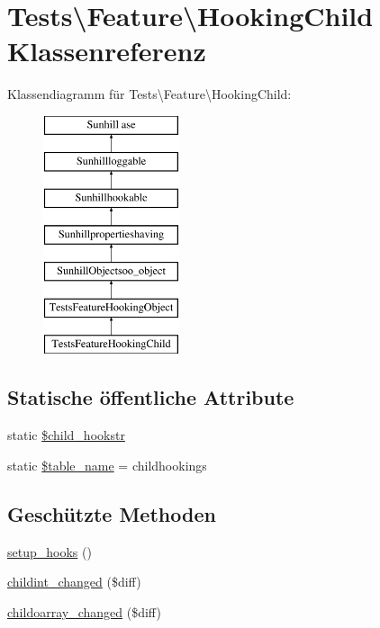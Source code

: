 \hypertarget{classTests_1_1Feature_1_1HookingChild}{}\section{Tests\textbackslash{}Feature\textbackslash{}Hooking\+Child Klassenreferenz}
\label{classTests_1_1Feature_1_1HookingChild}
Klassendiagramm für Tests\textbackslash{}Feature\textbackslash{}Hooking\+Child\+:\begin{figure}[H]
\begin{center}
\leavevmode
\includegraphics[height=7.000000cm]{d2/d77/classTests_1_1Feature_1_1HookingChild}
\end{center}
\end{figure}
\subsection*{Statische öffentliche Attribute}
\begin{DoxyCompactItemize}
\item 
static \hyperlink{classTests_1_1Feature_1_1HookingChild_a722d03536f89336d99b90f3ca7d25307}{\$child\+\_\+hookstr}
\item 
static \hyperlink{classTests_1_1Feature_1_1HookingChild_a7f3f2c83960a847928914cec7743a3bf}{\$table\+\_\+name} = \textquotesingle{}childhookings\textquotesingle{}
\end{DoxyCompactItemize}
\subsection*{Geschützte Methoden}
\begin{DoxyCompactItemize}
\item 
\hyperlink{classTests_1_1Feature_1_1HookingChild_a281af3f61767ad968cdf901dd60358ef}{setup\+\_\+hooks} ()
\item 
\hyperlink{classTests_1_1Feature_1_1HookingChild_aec22189c85e1742356e0a945559b86ce}{childint\+\_\+changed} (\$diff)
\item 
\hyperlink{classTests_1_1Feature_1_1HookingChild_ae4cc9a773f6ec10e27a12fc8951470a1}{childoarray\+\_\+changed} (\$diff)
\end{DoxyCompactItemize}
